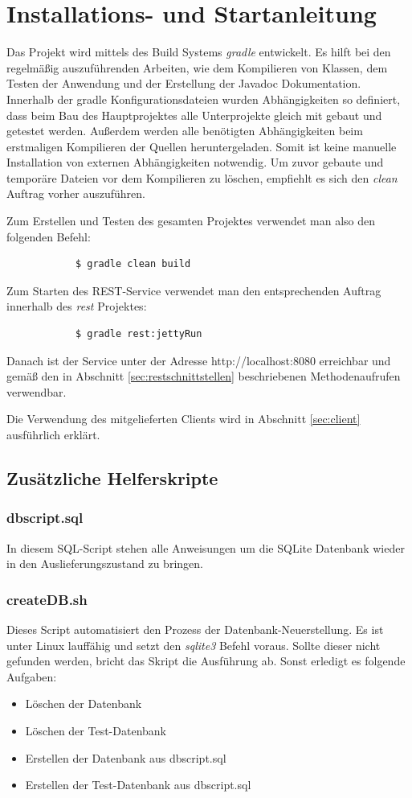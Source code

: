 \documentclass[12pt]{scrartcl}
\begin{document}
	\section{Installations- und Startanleitung}
		Das Projekt wird mittels des Build Systems \emph{gradle} entwickelt. Es hilft bei den regelmäßig auszuführenden Arbeiten, wie dem Kompilieren von Klassen, dem Testen der Anwendung und der Erstellung der Javadoc Dokumentation. Innerhalb der gradle Konfigurationsdateien wurden Abhängigkeiten so definiert, dass beim Bau des Hauptprojektes alle Unterprojekte gleich mit gebaut und getestet werden. Außerdem werden alle benötigten Abhängigkeiten beim erstmaligen Kompilieren der Quellen heruntergeladen. Somit ist keine manuelle Installation von externen Abhängigkeiten notwendig. Um zuvor gebaute und temporäre Dateien vor dem Kompilieren zu löschen, empfiehlt es sich den \emph{clean} Auftrag vorher auszuführen.
				
		Zum Erstellen und Testen des gesamten Projektes verwendet man also den folgenden Befehl:
		\begin{verbatim}
			$ gradle clean build
		\end{verbatim}
		
		Zum Starten des REST-Service verwendet man den entsprechenden Auftrag innerhalb des \emph{rest} Projektes:
		\begin{verbatim}
			$ gradle rest:jettyRun
		\end{verbatim}
		
		Danach ist der Service unter der Adresse http://localhost:8080 erreichbar und gemäß den in Abschnitt \ref{sec:restschnittstellen} beschriebenen Methodenaufrufen verwendbar.
		
		Die Verwendung des mitgelieferten Clients wird in Abschnitt \ref{sec:client} ausführlich erklärt.
		
		\subsection{Zusätzliche Helferskripte}
			\subsubsection{dbscript.sql}
				In diesem SQL-Script stehen alle Anweisungen um die SQLite Datenbank wieder in den Auslieferungszustand zu bringen.
			\subsubsection{createDB.sh}
				Dieses Script automatisiert den Prozess der Datenbank-Neuerstellung. Es ist unter Linux lauffähig und setzt den \emph{sqlite3} Befehl voraus. Sollte dieser nicht gefunden werden, bricht das Skript die Ausführung ab.
				Sonst erledigt es folgende Aufgaben:
				\begin{itemize}
					\item Löschen der Datenbank
					\item Löschen der Test-Datenbank
					\item Erstellen der Datenbank aus dbscript.sql
					\item Erstellen der Test-Datenbank aus dbscript.sql
				\end{itemize}
\end{document}
